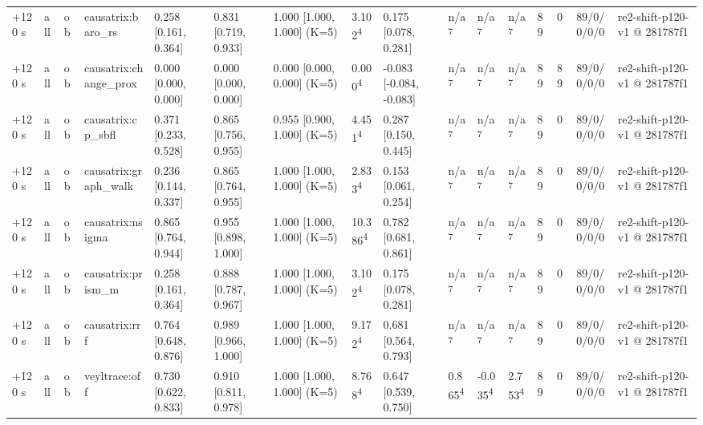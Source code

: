 \begin{table}[t]
\begin{tabular}{llllllllllllllll}
+120 s & all & ob & causatrix:baro\_rs & 0.258 [0.161, 0.364] & 0.831 [0.719, 0.933] & 1.000 [1.000, 1.000] (K=5) & 3.102\textsuperscript{4} & 0.175 [0.078, 0.281] & n/a\textsuperscript{7} & n/a\textsuperscript{7} & n/a\textsuperscript{7} & 89 & 0 & 89/0/0/0/0 & re2-shift-p120-v1 @ 281787f1 \\
+120 s & all & ob & causatrix:change\_prox & 0.000 [0.000, 0.000] & 0.000 [0.000, 0.000] & 0.000 [0.000, 0.000] (K=5) & 0.000\textsuperscript{4} & -0.083 [-0.084, -0.083] & n/a\textsuperscript{7} & n/a\textsuperscript{7} & n/a\textsuperscript{7} & 89 & 89 & 89/0/0/0/0 & re2-shift-p120-v1 @ 281787f1 \\
+120 s & all & ob & causatrix:cp\_sbfl & 0.371 [0.233, 0.528] & 0.865 [0.756, 0.955] & 0.955 [0.900, 1.000] (K=5) & 4.451\textsuperscript{4} & 0.287 [0.150, 0.445] & n/a\textsuperscript{7} & n/a\textsuperscript{7} & n/a\textsuperscript{7} & 89 & 0 & 89/0/0/0/0 & re2-shift-p120-v1 @ 281787f1 \\
+120 s & all & ob & causatrix:graph\_walk & 0.236 [0.144, 0.337] & 0.865 [0.764, 0.955] & 1.000 [1.000, 1.000] (K=5) & 2.833\textsuperscript{4} & 0.153 [0.061, 0.254] & n/a\textsuperscript{7} & n/a\textsuperscript{7} & n/a\textsuperscript{7} & 89 & 0 & 89/0/0/0/0 & re2-shift-p120-v1 @ 281787f1 \\
+120 s & all & ob & causatrix:nsigma & 0.865 [0.764, 0.944] & 0.955 [0.898, 1.000] & 1.000 [1.000, 1.000] (K=5) & 10.386\textsuperscript{4} & 0.782 [0.681, 0.861] & n/a\textsuperscript{7} & n/a\textsuperscript{7} & n/a\textsuperscript{7} & 89 & 0 & 89/0/0/0/0 & re2-shift-p120-v1 @ 281787f1 \\
+120 s & all & ob & causatrix:prism\_m & 0.258 [0.161, 0.364] & 0.888 [0.787, 0.967] & 1.000 [1.000, 1.000] (K=5) & 3.102\textsuperscript{4} & 0.175 [0.078, 0.281] & n/a\textsuperscript{7} & n/a\textsuperscript{7} & n/a\textsuperscript{7} & 89 & 0 & 89/0/0/0/0 & re2-shift-p120-v1 @ 281787f1 \\
+120 s & all & ob & causatrix:rrf & 0.764 [0.648, 0.876] & 0.989 [0.966, 1.000] & 1.000 [1.000, 1.000] (K=5) & 9.172\textsuperscript{4} & 0.681 [0.564, 0.793] & n/a\textsuperscript{7} & n/a\textsuperscript{7} & n/a\textsuperscript{7} & 89 & 0 & 89/0/0/0/0 & re2-shift-p120-v1 @ 281787f1 \\
+120 s & all & ob & veyltrace:off & 0.730 [0.622, 0.833] & 0.910 [0.811, 0.978] & 1.000 [1.000, 1.000] (K=5) & 8.768\textsuperscript{4} & 0.647 [0.539, 0.750] & 0.865\textsuperscript{4} & -0.035\textsuperscript{4} & 2.753\textsuperscript{4} & 89 & 0 & 89/0/0/0/0 & re2-shift-p120-v1 @ 281787f1 \\

\end{tabular}
\end{table}
